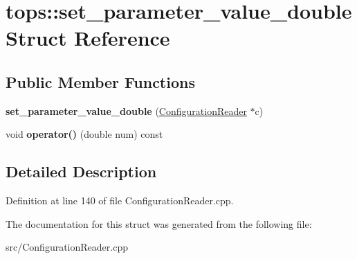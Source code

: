 \hypertarget{structtops_1_1set__parameter__value__double}{}\section{tops\+:\+:set\+\_\+parameter\+\_\+value\+\_\+double Struct Reference}
\label{structtops_1_1set__parameter__value__double}
\subsection*{Public Member Functions}
\begin{DoxyCompactItemize}
\item 
\mbox{\label{structtops_1_1set__parameter__value__double_a5b5125bee8e2bd086d484652ef72e725}} 
{\bfseries set\+\_\+parameter\+\_\+value\+\_\+double} (\hyperlink{classtops_1_1ConfigurationReader}{Configuration\+Reader} $\ast$c)
\item 
\mbox{\label{structtops_1_1set__parameter__value__double_a37ac23bdf72e1db0492f7ddc972aae5c}} 
void {\bfseries operator()} (double num) const
\end{DoxyCompactItemize}


\subsection{Detailed Description}


Definition at line 140 of file Configuration\+Reader.\+cpp.



The documentation for this struct was generated from the following file\+:\begin{DoxyCompactItemize}
\item 
src/Configuration\+Reader.\+cpp\end{DoxyCompactItemize}
